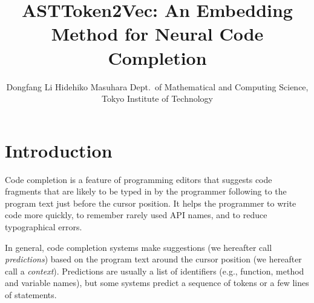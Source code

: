 \documentclass[E]{compsoft}
\begin{document}
\title{ASTToken2Vec: An Embedding Method for Neural Code Completion}

\author{Dongfang Li  \quad   Hidehiko Masuhara
%
%
%
%
%
{Dept.\ of Mathematical and Computing Science, Tokyo Institute of Technology}}




\maketitle \thispagestyle {empty}







\section{Introduction}
Code completion is a feature of programming editors that suggests code fragments that are likely to be typed in by the programmer following to the program text just before the cursor position.  It helps the programmer to write code more quickly, to remember rarely used API names, and to reduce typographical errors.

In general, code completion systems make suggestions (we hereafter call \emph{predictions}) based on the program text around the cursor position (we hereafter call a \emph{context}).  Predictions are usually a list of identifiers (e.g., function, method and variable names), but some systems predict a sequence of tokens or a few lines of statements.
\end{document}
